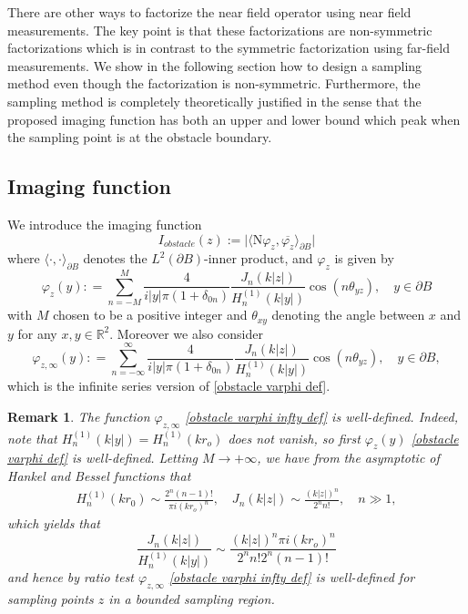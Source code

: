 \documentclass[final]{siamltex}
\newtheorem{remark}{Remark}
\begin{document}
There are other ways to factorize the near field operator \cite{Hu2014} using near field measurements. The key point is that these factorizations are non-symmetric factorizations which is in contrast to the symmetric factorization using far-field measurements. We show in the following section how to design a sampling method even though the factorization is non-symmetric. Furthermore, the sampling method is completely theoretically justified in the sense that the proposed imaging function has both an upper and lower bound which peak when the sampling point is at the obstacle boundary.
\subsection{Imaging function}
We introduce the imaging function
\begin{equation} \label{imaging function obstacle}
I_{obstacle}(z):= \big| \langle   \mathrm{N} \varphi_z, \overline{\varphi_z} \rangle_{\partial B} \big|
\end{equation}
where $\langle \cdot, \cdot \rangle_{\partial B}$ denotes the $L^2(\partial B)$-inner product, and $\varphi_z$ is given by
\begin{equation} \label{obstacle varphi def}
\varphi_{z}(y): = \sum_{n=-M}^M \frac{4}{i |y| \pi(1+\delta_{0n})}  \frac{J_n(k|z|) }{H_n^{(1)}(k|y|)}\cos(n\theta_{yz}), \quad y\in \partial B
\end{equation}
with $M$ chosen to be a positive integer and $\theta_{xy}$ denoting the angle between $x$  and $y$  for any $x,y \in \mathbb{R}^2$.  Moreover we also consider
\begin{equation} \label{obstacle varphi infty def}
\varphi_{z,\infty}(y): = \sum_{n=-\infty}^\infty \frac{4}{i |y| \pi(1+\delta_{0n})} \frac{J_n(k|z|) }{H_n^{(1)}(k|y|)} \cos(n\theta_{yz}), \quad y\in \partial B,
\end{equation}
which is the infinite series version of \eqref{obstacle varphi def}.

\begin{remark}
The function
$\varphi_{z,\infty}$ \eqref{obstacle varphi infty def} is well-defined. Indeed, note that $H_n^{(1)}(k|y|)=H_n^{(1)}(kr_o)$ does not vanish, so first $\varphi_z(y)$ \eqref{obstacle varphi def} is well-defined. Letting $M \to +\infty$, we have from the asymptotic of Hankel and Bessel functions \cite[Section 3.5]{CK} that
\begin{eqnarray*}
H_n^{(1)} (k r_0) \sim \frac{2^n (n-1)!}{\pi i (k r_o)^n}, \quad J_n(k|z|) \sim  \frac{ (k |z|)^n}{2^n  n!}, \quad n \gg 1,
\end{eqnarray*}
which yields that
\begin{equation*}
 \frac{J_n(k|z|) }{H_n^{(1)}(k|y|)} \sim  \frac{ (k |z|)^n \pi i (k r_o)^n}{2^n  n! 2^n (n-1)!}
\end{equation*}
and hence by ratio test $\varphi_{z,\infty}$ \eqref{obstacle varphi infty def} is well-defined for sampling points $z$ in a bounded sampling region.
\end{remark}
\end{document}
